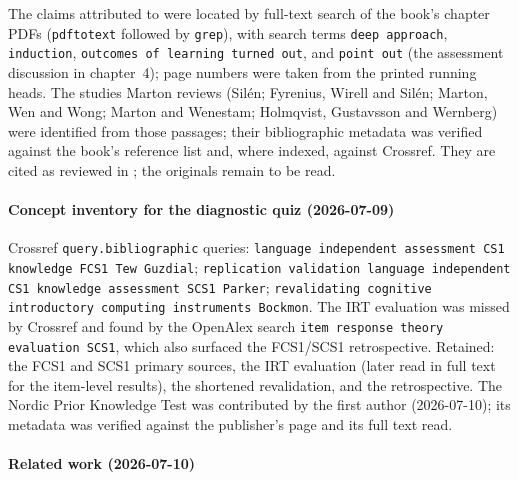 The claims attributed to \citeauthor{NCOL} were located by full-text
search of the book's chapter PDFs (\texttt{pdftotext} followed by
\texttt{grep}), with search terms \texttt{deep approach},
\texttt{induction}, \texttt{outcomes of learning turned out}, and
\texttt{point out} (the assessment discussion in chapter~4); page
numbers were taken from the printed running heads.
The studies Marton reviews (Silén; Fyrenius, Wirell and Silén; Marton, Wen
and Wong; Marton and Wenestam; Holmqvist, Gustavsson and Wernberg) were
identified from those passages; their bibliographic metadata was verified
against the book's reference list and, where indexed, against Crossref.
They are cited as reviewed in ; the originals remain to be
read.

\paragraph{Concept inventory for the diagnostic quiz (2026-07-09)}

Crossref \texttt{query.bibliographic} queries:
\texttt{language independent assessment CS1 knowledge FCS1 Tew Guzdial};
\texttt{replication validation language independent CS1 knowledge
assessment SCS1 Parker};
\texttt{revalidating cognitive introductory computing instruments
Bockmon}.
The IRT evaluation was missed by Crossref and found by the OpenAlex search
\texttt{item response theory evaluation SCS1}, which also surfaced the
FCS1/SCS1 retrospective.
Retained: the FCS1 and SCS1 primary sources, the IRT evaluation (later
read in full text for the item-level results), the shortened revalidation,
and the retrospective.
The Nordic Prior Knowledge Test was contributed by the first author
(2026-07-10); its metadata was verified against the publisher's page and
its full text read.

\paragraph{Related work (2026-07-10)}

